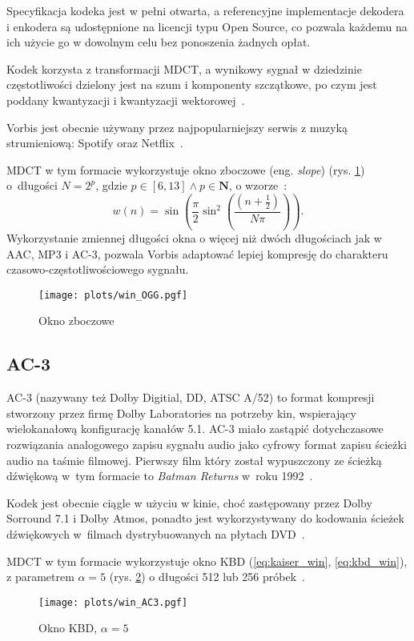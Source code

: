 \documentclass[pl,12pt]{aghdpl}
\let\Oldsubsection\subsection%
\renewcommand{\subsection}{\FloatBarrier\Oldsubsection}
\begin{document}
Specyfikacja kodeka jest w pełni otwarta, a referencyjne implementacje dekodera
i enkodera są udostępnione na licencji typu Open Source, co pozwala każdemu na
ich użycie go w dowolnym celu bez ponoszenia żadnych opłat.

Kodek korzysta z transformacji MDCT, a wynikowy sygnał w dziedzinie
częstotliwości dzielony jest na szum i komponenty szczątkowe, po czym jest
poddany kwantyzacji i kwantyzacji wektorowej~\cite{XiphVorbisDoc}.

Vorbis jest obecnie używany przez najpopularniejszy serwis z muzyką
strumieniową: Spotify oraz Netflix~\cite{SpotifyMastering, Ronca2013}.

MDCT w tym formacie wykorzystuje okno zboczowe (eng. \textit{slope}) (rys.
\ref{fig:win_OGG}) o~długości $N = 2^{p}$, gdzie $p \in [6,13] \land p \in \bm
N$, o wzorze~\cite{XiphVorbisDoc}:
\begin{equation}\label{eq:slope_win}
  w(n) = \sin\left(\frac{\pi}{2}\sin^2\left(\frac{\left(n +
  \frac{1}{2}\right)}{N\pi}\right)\right).
\end{equation}
Wykorzystanie zmiennej długości okna o więcej niż dwóch długościach jak w AAC,
MP3 i AC-3, pozwala Vorbis adaptować lepiej kompresję do charakteru
czasowo-częstotliwościowego sygnału.

\begin{figure}[!tbh]
  \centering
  \texttt{[image: plots/win\_OGG.pgf]}
  \caption{Okno zboczowe}
  \label{fig:win_OGG}
\end{figure}

\subsection{AC-3}
AC-3 (nazywany też Dolby Digitial, DD, ATSC A/52) to format kompresji stworzony
przez firmę Dolby Laboratories na potrzeby kin, wspierający wielokanałową
konfigurację kanałów 5.1. AC-3 miało zastąpić dotychczasowe rozwiązania
analogowego zapisu sygnału audio jako cyfrowy format zapisu ścieżki audio na
taśmie filmowej.  Pierwszy film który został wypuszczony ze ścieżką dźwiękową
w~tym formacie to \textit{Batman Returns} w~roku 1992~\cite{Fisher1992}.

Kodek jest obecnie ciągle w użyciu w kinie, choć zastępowany przez Dolby
Sorround 7.1 i Dolby Atmos, ponadto jest wykorzystywany do kodowania ścieżek
dźwiękowych w~filmach dystrybuowanych na płytach DVD~\cite{DolbyDigital}.

MDCT w tym formacie wykorzystuje okno KBD (\ref{eq:kaiser_win},
\ref{eq:kbd_win}), z parametrem $\alpha = 5$ (rys. \ref{fig:win_AC3}) o
długości 512 lub 256 próbek~\cite{atsc2012}.
\begin{figure}[!tbh]
  \centering
  \texttt{[image: plots/win\_AC3.pgf]}
  \caption{Okno KBD, $\alpha = 5$}
  \label{fig:win_AC3}
\end{figure}
\end{document}
